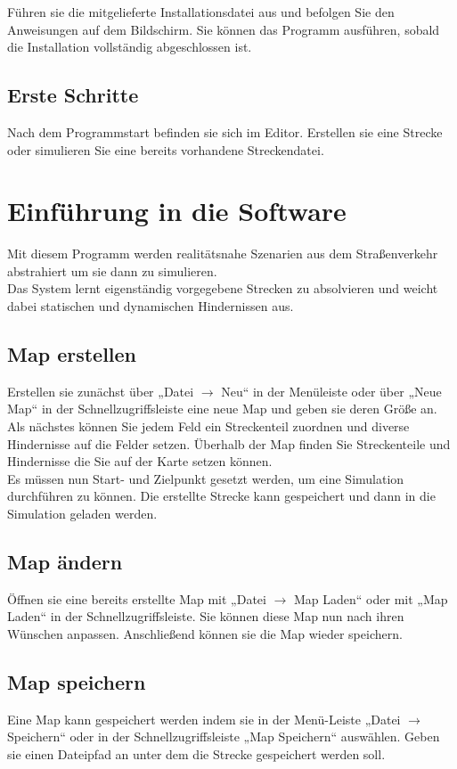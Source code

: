 \documentclass[11pt,a4paper]{article}
\begin{document}
Führen sie die mitgelieferte Installationsdatei aus und befolgen Sie den Anweisungen auf dem Bildschirm. Sie können das Programm ausführen, sobald die Installation vollständig abgeschlossen ist.

\subsection{Erste Schritte}

Nach dem Programmstart befinden sie sich im Editor. Erstellen sie eine Strecke oder simulieren Sie eine bereits vorhandene Streckendatei.

\newpage
\section{Einführung in die Software}
Mit diesem Programm werden realitätsnahe Szenarien aus dem Straßenverkehr abstrahiert um sie dann zu simulieren. \\
Das System lernt eigenständig vorgegebene Strecken zu absolvieren und weicht dabei statischen und dynamischen Hindernissen aus.

\subsection{Map erstellen}
Erstellen sie zunächst über „Datei $\rightarrow$ Neu“ in der Menüleiste oder über „Neue Map“ in der Schnellzugriffsleiste eine neue Map und geben sie deren Größe an. \\
Als nächstes können Sie jedem Feld ein Streckenteil zuordnen und diverse Hindernisse auf die Felder setzen.
Überhalb der Map finden Sie Streckenteile und Hindernisse die Sie auf der Karte setzen können.\\
Es müssen nun Start- und Zielpunkt gesetzt werden, um eine Simulation durchführen zu können. Die erstellte Strecke kann gespeichert und dann in die Simulation geladen werden. \\

\subsection{Map ändern}
Öffnen sie eine bereits erstellte Map mit „Datei $\rightarrow$ Map Laden“ oder mit „Map Laden“ in der Schnellzugriffsleiste. Sie können diese Map nun nach ihren Wünschen anpassen. 
Anschließend können sie die Map wieder speichern.
\newpage
\subsection{Map speichern}
Eine Map kann gespeichert werden indem sie in der Menü-Leiste „Datei $\rightarrow$ Speichern“ oder in der Schnellzugriffsleiste „Map Speichern“ auswählen. Geben sie einen Dateipfad an unter dem die Strecke gespeichert werden soll.
\end{document}
